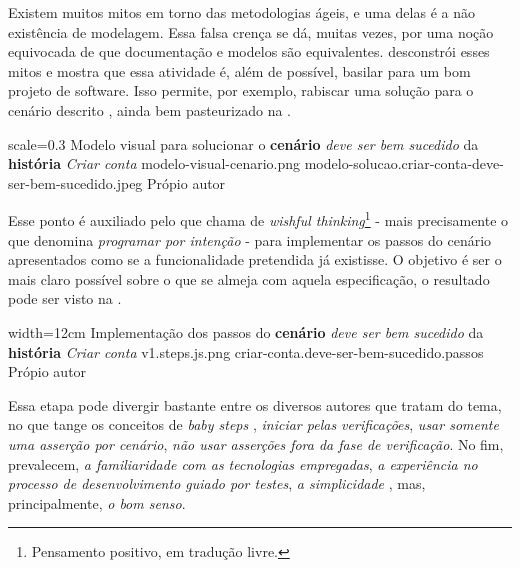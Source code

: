   Existem muitos mitos em torno das metodologias ágeis, e uma delas é a não existência de modelagem. Essa falsa crença se dá, muitas vezes, por uma noção equivocada de que documentação e modelos são equivalentes.  desconstrói esses mitos e mostra que essa atividade é, além de possível, basilar para um bom projeto de software. Isso permite, por exemplo, rabiscar uma solução para o cenário descrito \cite[pág. 57]{Ruby2011}, ainda bem pasteurizado na .

  \imagem
    {scale=0.3}
    {Modelo visual para solucionar o \textbf{cenário} \emph{deve ser bem sucedido} da \textbf{história} \emph{Criar conta}}
    {modelo-visual-cenario.png}
    {modelo-solucao.criar-conta-deve-ser-bem-sucedido.jpeg}
    {Própio autor\footnotemark}

  Esse ponto é auxiliado pelo que  chama de \emph{wishful thinking}\footnote{Pensamento positivo, em tradução livre.} - mais precisamente o que  denomina \emph{programar por intenção} - para implementar os passos do cenário apresentados como se a funcionalidade pretendida já existisse. O objetivo é ser o mais claro possível sobre o que se almeja com aquela especificação, o resultado pode ser visto na .

  \imagem
    {width=12cm}
    {Implementação dos passos do \textbf{cenário} \emph{deve ser bem sucedido} da \textbf{história} \emph{Criar conta}}
    {v1.steps.js.png}
    {criar-conta.deve-ser-bem-sucedido.passos}
    {Própio autor}

  Essa etapa pode divergir bastante entre os diversos autores que tratam do tema, no que tange os conceitos de \emph{baby steps} \cite[pág. 1]{Aniche2011}, \emph{iniciar pelas verificações}, \emph{usar somente uma asserção por cenário}, \emph{não usar asserções fora da fase de verificação}. No fim, prevalecem, \emph{a familiaridade com as tecnologias empregadas}, \emph{a experiência no processo de desenvolvimento guiado por testes}, \emph{a simplicidade} \cite[pág. xii]{Beck2003}, mas, principalmente, \emph{o bom senso}.


